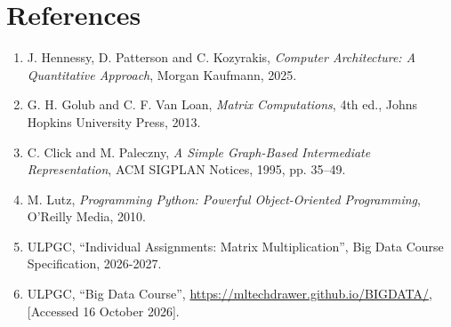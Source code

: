 \documentclass[10pt,conference,a4paper]{IEEEtran}
\begin{document}
\section*{References}
\begin{enumerate}
    \item J. Hennessy, D. Patterson and C. Kozyrakis, \textit{Computer Architecture: A Quantitative Approach}, Morgan Kaufmann, 2025.
    \item G. H. Golub and C. F. Van Loan, \textit{Matrix Computations}, 4th ed., Johns Hopkins University Press, 2013.
    \item C. Click and M. Paleczny, \textit{A Simple Graph-Based Intermediate Representation}, ACM SIGPLAN Notices, 1995, pp. 35--49.
    \item M. Lutz, \textit{Programming Python: Powerful Object-Oriented Programming}, O'Reilly Media, 2010.
    \item ULPGC, ``Individual Assignments: Matrix Multiplication'', Big Data Course Specification, 2026-2027.
    \item ULPGC, ``Big Data Course'', \url{https://mltechdrawer.github.io/BIGDATA/}, [Accessed 16 October 2026].
\end{enumerate}
\end{document}
